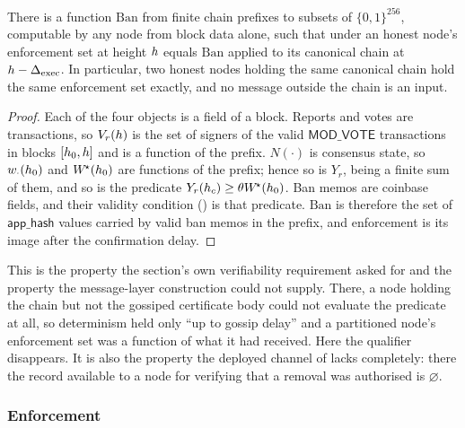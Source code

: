 \begin{theorem}
\label{thm:23:verifiable}
There is a function $\mathrm{Ban}$ from finite chain prefixes to subsets of $\{0,1\}^{256}$,
computable by any node from block data alone, such that under
 an honest node's enforcement set at
height $h$ equals $\mathrm{Ban}$ applied to its canonical chain at $h - \Delta_{\mathrm{exec}}$.
In particular, two honest nodes holding the same canonical chain hold the same enforcement set
exactly, and no message outside the chain is an input.
\end{theorem}

\begin{proof}
Each of the four objects is a field of a block. Reports and votes are transactions, so
$V_r(h)$ is the set of signers of the valid $\mathsf{MOD\_VOTE}$ transactions in blocks
$[h_0, h]$ and is a function of the prefix. $N(\cdot)$ is consensus state, so
$w_{\cdot}(h_0)$ and $W^{\!\star}(h_0)$ are functions of the prefix; hence so is
$Y_r$, being a finite sum of them, and so is the predicate $Y_r(h_c) \ge
\theta W^{\!\star}(h_0)$. Ban memos are coinbase fields, and their validity condition
() is that predicate. $\mathrm{Ban}$ is therefore the set of $\mathsf{app\_hash}$
values carried by valid ban memos in the prefix, and enforcement is its image after the
confirmation delay.
\end{proof}

This is the property the section's own verifiability requirement asked for and the property the
message-layer construction could not supply. There, a node holding the chain but not the gossiped
certificate body could not evaluate the predicate at all, so determinism held only ``up to gossip
delay'' and a partitioned node's enforcement set was a function of what it had received. Here the
qualifier disappears. It is also the property the deployed channel of
 lacks completely: there the record available to a node for verifying
that a removal was authorised is $\varnothing$.

\subsubsection{Enforcement}
\label{sec:23:enforcement}

